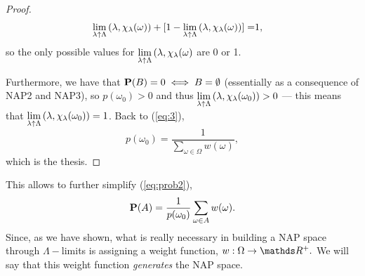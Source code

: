 \documentclass[draft.tex]{subfiles}
\begin{document}
\begin{proof}
\begin{align*}
            \lim\limits_{\lambda \uparrow \Lambda}{(\lambda, \chi_{\lambda}(\omega))}+[1-
            \lim\limits_{\lambda \uparrow \Lambda}{(\lambda, \chi_{\lambda}(\omega))}] =& 1,
        \end{align*}
        so the only possible values for $
            \lim\limits_{\lambda \uparrow \Lambda}{(\lambda, \chi_{\lambda}(\omega)}$ are 0 or 1.
        \par Furthermore, we have that $\textbf{P}(B) = 0 \iff B = \emptyset$ (essentially as a consequence of \textsf{NAP2} and \textsf{NAP3}), so $p(\omega_{0}) > 0$ and thus $\lim\limits_{\lambda \uparrow \Lambda}{(\lambda, \chi_{\lambda}(\omega_{0}))} > 0$ --- this means that $\lim\limits_{\lambda \uparrow \Lambda}{(\lambda, \chi_{\lambda}(\omega_{0}))} = 1$. Back to (\ref{eq:3}),
        \begin{equation*}
            p(\omega_{0}) = \frac{1}{\sum\limits_{\omega \in \Omega} w(\omega)},
        \end{equation*}
        which is the thesis.
    \end{proof}
    This allows to further simplify (\ref{eq:prob2}), 
    \begin{equation}
    \label{eq:prob3}
    \textbf{P}(A) = \frac{1}{p(\omega_{0})} \sum\limits_{\omega \in A} w(\omega).
    \end{equation}
    Since, as we have shown, what is really necessary in building a NAP space through $\Lambda-$limits is assigning a weight function, $w: \Omega \to \RR^{+}.$ We will say that this weight function \emph{generates} the NAP space.
\end{document}
